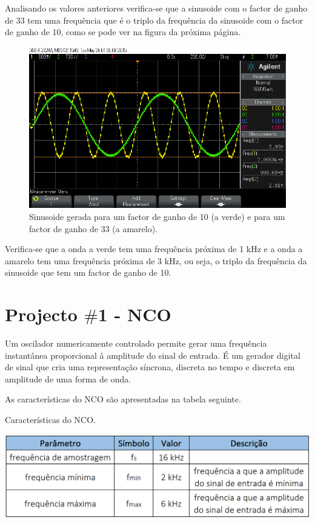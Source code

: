 \documentclass[11pt]{article}
\numberwithin{equation}{section}
\begin{document}
Analisando os valores anteriores verifica-se que a sinusoide com o factor de ganho de 33 tem uma frequência que é o triplo da frequência da sinusoide com o factor de ganho de 10, como se pode ver na figura da próxima página.

\begin{figure}[H]
	\centering
	\includegraphics[keepaspectratio=true, scale=0.37]{exps/demonstracao}
	\caption{Sinusoide gerada para um factor de ganho de 10 (a verde) e para um factor de ganho de 33 (a amarelo).}
	\vspace{-0.8em}
\end{figure}

Verifica-se que a onda a verde tem uma frequência próxima de 1 kHz e a onda a amarelo tem uma frequência próxima de 3 kHz, ou seja, o triplo da frequência da sinusoide que tem um factor de ganho de 10.

\pagebreak

\section{Projecto $\#$1 - NCO}

Um oscilador numericamente controlado permite gerar uma frequência instantânea proporcional â amplitude do sinal de entrada. É um gerador digital de sinal que cria uma representação síncrona, discreta no tempo e discreta em amplitude de uma forma de onda.

As características do NCO são apresentadas na tabela seguinte.

\begin{table}[H]
	\centering
	\caption{Características do NCO.}
	\vspace{-1.5mm}
	\includegraphics[keepaspectratio=true, scale=0.45]{tabelas/tabela1}
\end{table}
\end{document}
